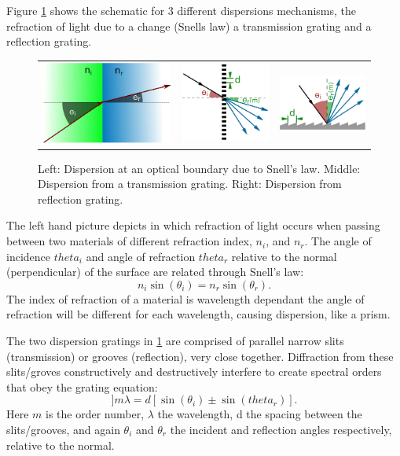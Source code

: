Figure \cref{fig:dispersion_elements} shows the schematic for 3 different dispersions mechanisms, the refraction of light due to a change (Snells law) a transmission grating and a reflection grating.
\begin{figure}
    \centering
    \begin{tabular}{ccc}
   \includegraphics[width=0.3\linewidth]{figures/spectroscopy/snells_law} & \includegraphics[width=0.2\linewidth]{figures/spectroscopy/dispersion_grism-transmission} & \includegraphics[width=0.3\linewidth]{figures/spectroscopy/dispersion_grism-reflection} \\
\end{tabular}
    \caption{Left: Dispersion at an optical boundary due to Snell's law.
        Middle: Dispersion from a transmission grating.
        Right: Dispersion from reflection grating.}
    \label{fig:dispersion_elements}
\end{figure}
The left hand picture depicts in which refraction of light occurs when passing between two materials of different refraction index, $n_i$, and $n_r$.
The angle of incidence $theta_i$ and angle of refraction $theta_r$ relative to the normal (perpendicular) of the surface are related through Snell's law:
\[n_i \sin(\theta_i) = n_r \sin(\theta_r).\]
The index of refraction of a material is wavelength dependant the angle of refraction will be different for each wavelength, causing dispersion, like a prism.

The two dispersion gratings in \cref{fig:dispersion_elements} are comprised of parallel narrow slits (transmission) or grooves (reflection), very close together.
Diffraction from these slits/groves constructively and destructively interfere to create spectral orders that obey the grating equation:
\begin{equation}
]m \lambda = d [\sin(\theta_i) \pm \sin(theta_r)].
\end{equation}
Here $m$ is the order number, $\lambda$ the wavelength, d the spacing between the slits/grooves, and again $\theta_i$ and $\theta_r$ the incident and reflection angles respectively, relative to the normal.

